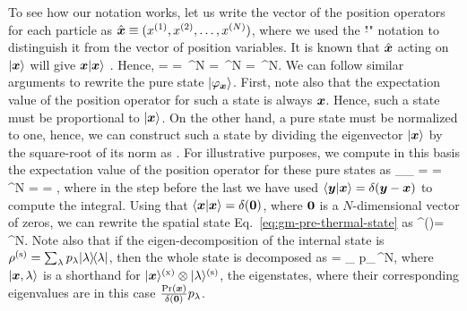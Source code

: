 To see how our notation works, let us write the vector of the position operators for each particle as $\hat{\boldsymbol{x}}\equiv(x^{(1)},x^{(2)},\dots,x^{(N)})$, where we used the "$\hat{}$" notation to distinguish it from the vector of position variables.
It is known that $\hat{\boldsymbol{x}}$ acting on $\vert{\ensuremath{\boldsymbol{x}}}\rangle$ will give $\boldsymbol{x}\vert{\ensuremath{\boldsymbol{x}}}\rangle$ \cite{Sakurai2010, Cohen-Tannoudji1977}.
Hence,
\be
   = \mtxid =  \int {}\,^N = \int {} \,^N = \int {} \,^N.
\ee
We can follow similar arguments to rewrite the pure state $\vert{\varphi_{\ensuremath{\boldsymbol{x}}}}\rangle$.
First, note also that the expectation value of the position operator for such a state is always $\boldsymbol{x}$.
Hence, such a state must be proportional to $\vert{\ensuremath{\boldsymbol{x}}}\rangle$.
On the other hand, a pure state must be normalized to one, hence, we can construct such a state by dividing the eigenvector $\vert{\ensuremath{\boldsymbol{x}}}\rangle$ by the square-root of its norm as
\be
   \equiv {}.
\ee
For illustrative purposes, we compute in this basis the expectation value of the position operator for these pure states as
\be
  _{\varphi_{}} =  =
  \int {}
  {} \,^N =
   =
  ,
\ee
where in the step before the last we have used $\langle{\ensuremath{\boldsymbol{y}}}\vert{\ensuremath{\boldsymbol{x}}}\rangle=\delta(\boldsymbol{y}-\boldsymbol{x})$ to compute the integral.
Using that $\langle{\ensuremath{\boldsymbol{x}}}\vert{\ensuremath{\boldsymbol{x}}}\rangle=\delta(\boldsymbol{0})$, where $\boldsymbol{0}$ is a $N$-dimensional vector of zeros, we can rewrite the spatial state Eq.~\eqref{eq:gm-pre-thermal-state} as
\be
  \rho^{()}=\int {} \,^N.
  \label{eq:gm-thermal-state}
\ee
Note also that if the eigen-decomposition of the internal state is $\rho^{(\text{s})} = \sum_{\lambda} p_{\lambda}\vert{\lambda}\rangle{\!}\langle{\lambda}\vert$, then the whole state is decomposed as
\be
  \rho = \int\sum_{\lambda}  p_\lambda {}\,^N,
  \label{eq:gm-eigendecomposition-of-state}
\ee
where $\vert{\ensuremath{\boldsymbol{x}},\lambda}\rangle$ is a shorthand for $\vert{\ensuremath{\boldsymbol{x}}}\rangle^{(\text{x})}\otimes\vert{\lambda}\rangle^{(\text{s})}$, the eigenstates, where their corresponding eigenvalues are in this case $\frac{\text{Pr}(\boldsymbol{x})}{\delta(\boldsymbol{0})} p_\lambda$.

